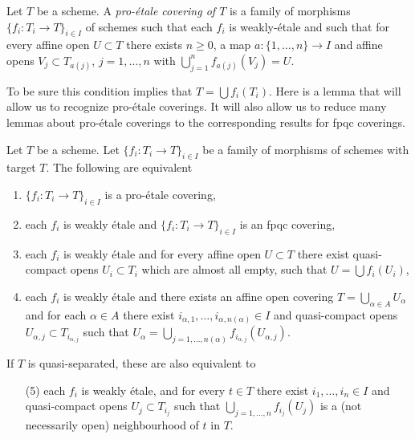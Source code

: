 \begin{definition}
\label{definition-fpqc-covering}
Let $T$ be a scheme. A {\it pro-\'etale covering of $T$} is a family
of morphisms $\{f_i : T_i \to T\}_{i \in I}$ of schemes
such that each $f_i$ is weakly-\'etale and such that for every affine open
$U \subset T$ there exists $n \geq 0$, a map
$a : \{1, \ldots, n\} \to I$ and affine opens
$V_j \subset T_{a(j)}$, $j = 1, \ldots, n$
with $\bigcup_{j = 1}^n f_{a(j)}(V_j) = U$.
\end{definition}

\noindent
To be sure this condition implies that $T = \bigcup f_i(T_i)$.
Here is a lemma that will allow us to recognize pro-\'etale coverings.
It will also allow us to reduce many lemmas about pro-\'etale coverings
to the corresponding results for fpqc coverings.

\begin{lemma}
\label{lemma-recognize-proetale-covering}
Let $T$ be a scheme. Let $\{f_i : T_i \to T\}_{i \in I}$ be a family of
morphisms of schemes with target $T$. The following are equivalent
\begin{enumerate}
\item $\{f_i : T_i \to T\}_{i \in I}$ is a pro-\'etale covering,
\item each $f_i$ is weakly \'etale and $\{f_i : T_i \to T\}_{i \in I}$
is an fpqc covering,
\item each $f_i$ is weakly \'etale and for every affine open $U \subset T$
there exist quasi-compact opens $U_i \subset T_i$ which are almost all empty,
such that $U = \bigcup f_i(U_i)$,
\item each $f_i$ is weakly \'etale and there exists an affine open covering
$T = \bigcup_{\alpha \in A} U_\alpha$ and for each $\alpha \in A$
there exist $i_{\alpha, 1}, \ldots, i_{\alpha, n(\alpha)} \in I$
and quasi-compact opens $U_{\alpha, j} \subset T_{i_{\alpha, j}}$ such that
$U_\alpha =
\bigcup_{j = 1, \ldots, n(\alpha)} f_{i_{\alpha, j}}(U_{\alpha, j})$.
\end{enumerate}
If $T$ is quasi-separated, these are also equivalent to
\begin{enumerate}
\item[(5)] each $f_i$ is weakly \'etale, and for every $t \in T$ there exist
$i_1, \ldots, i_n \in I$ and quasi-compact opens $U_j \subset T_{i_j}$
such that $\bigcup_{j = 1, \ldots, n} f_{i_j}(U_j)$ is a
(not necessarily open) neighbourhood of $t$ in $T$.
\end{enumerate}
\end{lemma}

